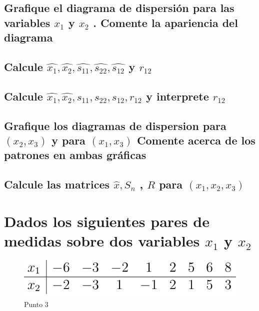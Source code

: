 \documentclass[10pt,a4paper]{article} %
\begin{document}
        \subsection{Grafique el diagrama de dispersión para las variables $ x_1
        $  y $ x_2   $ . Comente la apariencia del diagrama}

        \subsection{Calcule $ \hat{x_1}  , \hat{x_2}  , \hat{s_{11}}  ,
        \hat{s_{22}}  , \hat{s_{12}}   $  y $ r_{12}  $ }

        \subsection{Calcule $ \hat{x_1} , \hat{x_2}  , s_{11} , s_{22} , s_{12} ,
        r_{12}   $  y interprete $ r_{12}  $ }

        \subsection{Grafique los diagramas de dispersion para $ (x_2 , x_3 )  $
        y para $ (x_1 , x_3 )  $  Comente acerca de los patrones en ambas
        gráficas}

        \subsection{Calcule las matrices $ \hat{x}  , S_n    $ , $ R  $ para $
        (x_1 , x_2 , x_3 )  $   }

    \section{Dados los siguientes pares de medidas sobre dos variables $ x_1  $
    y $ x_2   $  }
        \begin{figure}[h!]
            \centering
            \includegraphics[width=0.5\linewidth]{fig.png}
            \caption{Punto 3}
            \label{fig:fig}
        \end{figure}
\end{document}
